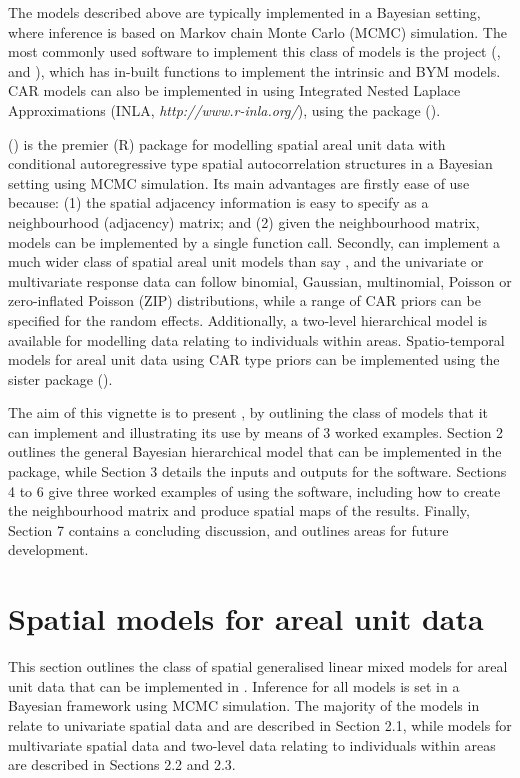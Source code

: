 \documentclass[article,shortnames,nojss]{jss}
\begin{document}
\hspace{1cm} The models described above are typically implemented in a Bayesian setting, where inference is based on Markov chain Monte Carlo (MCMC) simulation. The most commonly used software to implement this class of models is the  project (\cite{lunn2009},  and ), which has in-built functions to implement the intrinsic and BYM models. CAR models can also be implemented in  using Integrated Nested Laplace Approximations (INLA, \emph{http://www.r-inla.org/}), using the package  (\citealp{rue2009}).

\hspace{1cm}  (\citealp{lee2013}) is the premier \proglang(R) package for modelling spatial areal unit data with conditional autoregressive type spatial autocorrelation structures in a Bayesian setting using MCMC simulation. Its main advantages are firstly ease of use because: (1) the spatial adjacency information is easy to specify as a neighbourhood (adjacency) matrix; and (2) given the neighbourhood matrix, models can be implemented by a single function call. Secondly,  can implement a much wider class of spatial areal unit models than say , and the univariate or multivariate response data can follow binomial, Gaussian, multinomial, Poisson or zero-inflated Poisson (ZIP) distributions, while a range of CAR priors can be specified for the random effects. Additionally, a two-level hierarchical model is available for modelling data relating to individuals within areas. Spatio-temporal models for areal unit data using CAR type priors can be implemented using the sister package  (\citealp{carbayesst}).

\hspace{1cm} The aim of this vignette is to present , by outlining the class of models that it can implement and illustrating its use by means of 3 worked examples. Section 2 outlines the general Bayesian hierarchical model that can be implemented in the  package, while Section 3 details the inputs and outputs for the software.  Sections 4 to 6 give three worked examples of using the software, including how to create the neighbourhood matrix and produce spatial maps of the results. Finally, Section 7 contains a concluding discussion, and outlines areas for future development.


\section{Spatial models for areal unit data}
This section outlines the class of spatial generalised linear mixed models for areal unit data that can be implemented in . Inference for all models is set in a Bayesian framework using MCMC simulation. The majority of the models in  relate to univariate spatial data and are described in Section 2.1, while models for multivariate spatial data and two-level data relating to individuals within areas are described in Sections 2.2 and 2.3.
\end{document}
